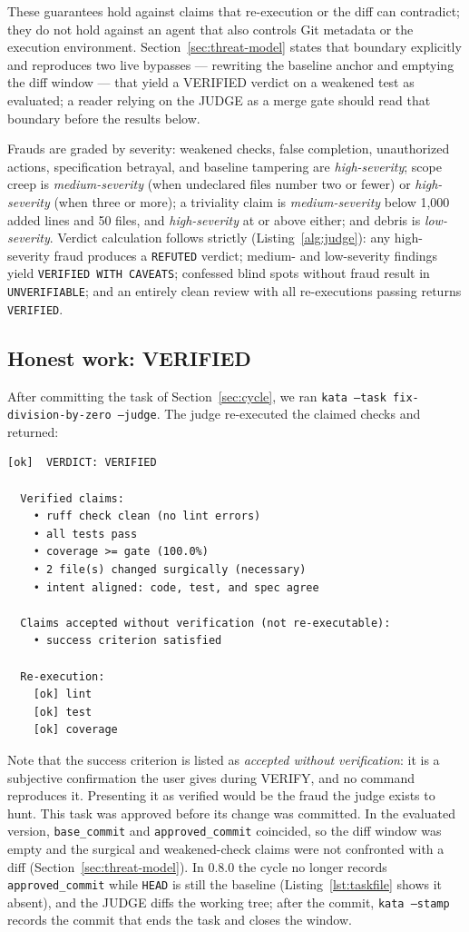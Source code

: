 \documentclass{sbc2019}%
\begin{document}
These guarantees hold against claims that re-execution or the diff can
contradict; they do not hold against an agent that also controls Git
metadata or the execution environment. Section~\ref{sec:threat-model} states
that boundary explicitly and reproduces two live bypasses --- rewriting the
baseline anchor and emptying the diff window --- that yield a VERIFIED
verdict on a weakened test as evaluated; a reader relying on the JUDGE as a
merge gate should read that boundary before the results below.

Frauds are graded by severity: weakened checks, false completion,
unauthorized actions, specification betrayal, and baseline tampering are
\emph{high-severity}; scope creep is \emph{medium-severity} (when
undeclared files number two or fewer) or \emph{high-severity} (when three or
more); a triviality claim is \emph{medium-severity} below 1{,}000 added lines
and 50 files, and \emph{high-severity} at or above either; and debris is
\emph{low-severity}. Verdict calculation follows
strictly (Listing~\ref{alg:judge}): any high-severity fraud produces a
\texttt{REFUTED} verdict; medium- and low-severity findings yield
\texttt{VERIFIED WITH CAVEATS}; confessed blind spots without fraud result
in \texttt{UNVERIFIABLE}; and an entirely clean review with all re-executions
passing returns \texttt{VERIFIED}.

\subsection{Honest work: VERIFIED}

After committing the task of Section~\ref{sec:cycle}, we ran
\texttt{kata --task fix-division-by-zero --judge}. The judge re-executed
the claimed checks and returned:

\begin{lstlisting}
[ok]  VERDICT: VERIFIED

  Verified claims:
    • ruff check clean (no lint errors)
    • all tests pass
    • coverage >= gate (100.0%)
    • 2 file(s) changed surgically (necessary)
    • intent aligned: code, test, and spec agree

  Claims accepted without verification (not re-executable):
    • success criterion satisfied

  Re-execution:
    [ok] lint
    [ok] test
    [ok] coverage
\end{lstlisting}

Note that the success criterion is listed as \emph{accepted without
verification}: it is a subjective confirmation the user gives during VERIFY,
and no command reproduces it. Presenting it as verified would be the
fraud the judge exists to hunt. This task was approved before its change was
committed. In the evaluated version, \texttt{base\_commit} and
\texttt{approved\_commit} coincided, so the diff window was empty and the
surgical and weakened-check claims were not confronted with a diff
(Section~\ref{sec:threat-model}). In 0.8.0 the cycle no longer records
\texttt{approved\_commit} while \texttt{HEAD} is still the baseline
(Listing~\ref{lst:taskfile} shows it absent), and the JUDGE diffs the working
tree; after the commit, \texttt{kata --stamp} records the commit that ends the
task and closes the window.
\end{document}
